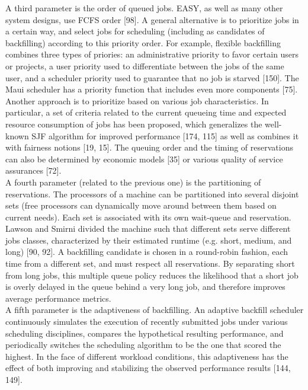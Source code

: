 A third parameter is the order of queued jobs. EASY, as well as many other system designs, use FCFS order [98]. A general alternative is to prioritize jobs in a certain way, and select jobs for scheduling (including as candidates of backfilling) according to this priority order. For example, flexible backfilling combines three types of priories: an administrative priority to favor certain users or projects, a user priority used to differentiate between the jobs of the same user, and a scheduler priority used to guarantee that no job is starved [150]. The Maui scheduler has a priority function that includes even more components [75]. Another approach is to prioritize based on various job characteristics. In particular, a set of criteria related to the current queueing time and expected resource consumption of jobs has been proposed, which generalizes the well-known SJF algorithm for improved performance [174, 115] as well as combines it with fairness notions [19, 15]. The queuing order and the timing of reservations can also be determined by economic models [35] or various quality of service assurances [72].\\

A fourth parameter (related to the previous one) is the partitioning of reservations. The processors of a machine can be partitioned into several disjoint sets (free processors can dynamically move around between them based on current needs). Each set is associated with its own wait-queue and reservation. Lawson and Smirni divided the machine such that different sets serve different jobs classes, characterized by their estimated runtime (e.g. short, medium, and long) [90, 92]. A backfilling candidate is chosen in a round-robin fashion, each time from a different set, and must respect all reservations. By separating short from long jobs, this multiple queue policy reduces the likelihood that a short job is overly delayed in the queue behind a very long job, and therefore improves average performance metrics.\\

A fifth parameter is the adaptiveness of backfilling. An adaptive backfill scheduler continuously simulates the execution of recently submitted jobs under various scheduling disciplines, compares the hypothetical resulting performance, and periodically switches the scheduling algorithm
to be the one that scored the highest. In the face of different workload conditions, this adaptiveness has the effect of both improving and stabilizing the observed performance results [144, 149].\\

